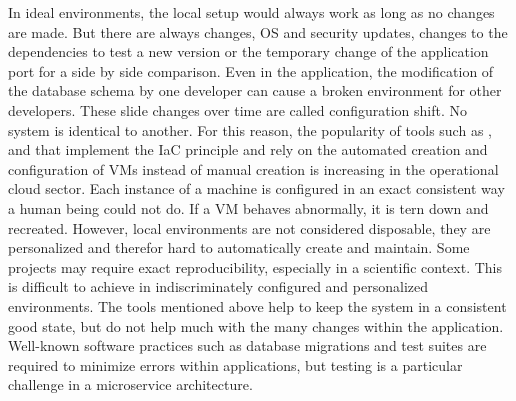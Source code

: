 \documentclass[12pt, a4paper]{article}
\begin{document}
        In ideal environments, the local setup would always work as long as no changes are made. But there are always changes, \ac{OS} and security updates, changes to the dependencies to test a new version or the temporary change of the application port for a side by side comparison. Even in the application, the modification of the database schema by one developer can cause a broken environment for other developers. These slide changes over time are called configuration shift. No system is identical to another. For this reason, the popularity of tools such as ,  and  that implement the \ac{IaC} principle and rely on the automated creation and configuration of \ac{VM}s instead of manual creation is increasing in the operational cloud sector. Each instance of a machine is configured in an exact consistent way a human being could not do. If a \ac{VM} behaves abnormally, it is tern down and recreated. However, local environments are not considered disposable, they are personalized and therefor hard to automatically create and maintain. Some projects may require exact reproducibility, especially in a scientific context. This is difficult to achieve in indiscriminately configured and personalized environments.\newline
        The tools mentioned above help to keep the system in a consistent good state, but do not help much with the many changes within the application. Well-known software practices such as database migrations and test suites are required to minimize errors within applications, but testing is a particular challenge in a microservice architecture.
\end{document}
